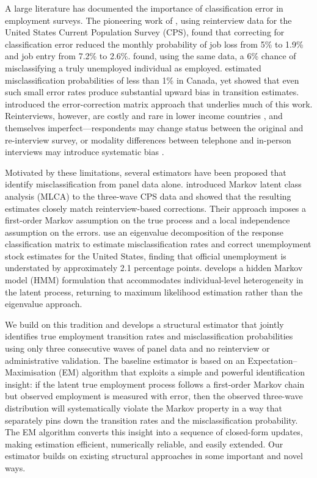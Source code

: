 A large literature has documented the importance of classification error in
employment surveys. The pioneering work of \citet{porteba1986}, using reinterview
data for the United States Current Population Survey (CPS), found that correcting
for classification error reduced the monthly probability of job loss from 5\%
to 1.9\% and job entry from 7.2\% to 2.6\%. \citet{chua1987} found, using the
same data, a 6\% chance of misclassifying a truly unemployed individual as
employed. \citet{singh1995} estimated misclassification probabilities of less
than 1\% in Canada, yet showed that even such small error rates produce
substantial upward bias in transition estimates. \citet{abowd1985} introduced the
error-correction matrix approach that underlies much of this work. Reinterviews,
however, are costly and rare in lower income countries \citep{ashenfelter1986}, and
themselves imperfect---respondents may change status between the original and
re-interview survey, or modality differences between telephone and in-person
interviews may introduce systematic bias \citep{Pauline2026ModeEffects}.

Motivated by these limitations, several estimators have been proposed that
identify misclassification from panel data alone.
\citet{biemer2000} introduced Markov latent class analysis (MLCA) to the
three-wave CPS data and showed that the resulting estimates closely match
reinterview-based corrections. Their approach imposes a first-order Markov
assumption on the true process and a local independence assumption on the
errors. \citet{feng2013} use an eigenvalue decomposition of the response
classification matrix to estimate misclassification rates and correct unemployment
stock estimates for the United States, finding that official unemployment is
understated by approximately 2.1 percentage points. \citet{shibata2019} develops
a hidden Markov model (HMM) formulation that accommodates individual-level
heterogeneity in the latent process, returning to maximum likelihood estimation
rather than the eigenvalue approach. 

We build on this tradition and develops a structural estimator that jointly identifies true
employment transition rates and misclassification probabilities using only three
consecutive waves of panel data and no reinterview or administrative validation.
The baseline estimator is based on an Expectation--Maximisation (EM) algorithm that
exploits a simple and powerful identification insight: if the latent true
employment process follows a first-order Markov chain but observed employment is
measured with error, then the observed three-wave distribution will systematically
violate the Markov property in a way that separately pins down the transition
rates and the misclassification probability. The EM algorithm converts this
insight into a sequence of closed-form updates, making estimation efficient,
numerically reliable, and easily extended. Our estimator builds on
existing structural approaches in some important and novel ways.

